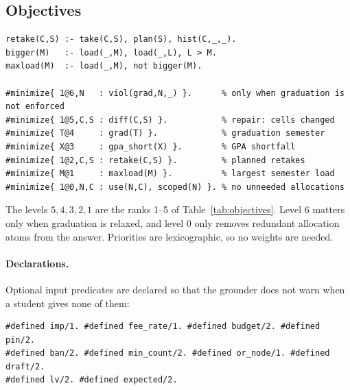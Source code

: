 \documentclass[10pt,a4paper]{article}
\begin{document}
\subsection{Objectives}
 
\begin{lstlisting}
retake(C,S) :- take(C,S), plan(S), hist(C,_,_).
bigger(M)   :- load(_,M), load(_,L), L > M.
maxload(M)  :- load(_,M), not bigger(M).
 
#minimize{ 1@6,N   : viol(grad,N,_) }.      % only when graduation is not enforced
#minimize{ 1@5,C,S : diff(C,S) }.           % repair: cells changed
#minimize{ T@4     : grad(T) }.             % graduation semester
#minimize{ X@3     : gpa_short(X) }.        % GPA shortfall
#minimize{ 1@2,C,S : retake(C,S) }.         % planned retakes
#minimize{ M@1     : maxload(M) }.          % largest semester load
#minimize{ 1@0,N,C : use(N,C), scoped(N) }. % no unneeded allocations
\end{lstlisting}
The levels $5,4,3,2,1$ are the ranks 1--5 of Table~\ref{tab:objectives}.
Level $6$ matters only when graduation is relaxed, and level $0$ only removes
redundant allocation atoms from the answer. Priorities are lexicographic, so no
weights are needed.
 
\paragraph{Declarations.}
Optional input predicates are declared so that the grounder does not warn
when a student gives none of them:
\begin{lstlisting}
#defined imp/1. #defined fee_rate/1. #defined budget/2. #defined pin/2.
#defined ban/2. #defined min_count/2. #defined or_node/1. #defined draft/2.
#defined lv/2. #defined expected/2.
\end{lstlisting}
 
 
\end{document}
